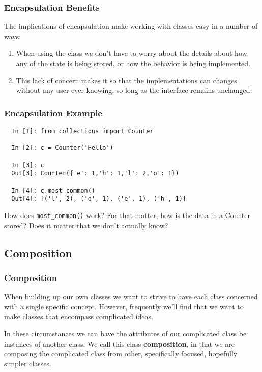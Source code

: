 \documentclass{beamer}
\begin{document}
\begin{frame}
  \frametitle{Encapsulation Benefits}
  The implications of encapsulation make working with classes easy in a number of ways: \vspace{4mm}

  \begin{enumerate}
    \item<1-> When using the class we don't have to worry about the details about how any of the state is being stored, or how the behavior is being implemented.
    \item<2-> This lack of concern makes it so that the implementations can changes without any user ever knowing, so long as the interface remains unchanged.
  \end{enumerate}
\end{frame}

\begin{frame}[fragile]
  \frametitle{Encapsulation Example}
  \begin{lstlisting}
  In [1]: from collections import Counter

  In [2]: c = Counter('Hello')
 
  In [3]: c
  Out[3]: Counter({'e': 1,'h': 1,'l': 2,'o': 1})

  In [4]: c.most_common()
  Out[4]: [('l', 2), ('o', 1), ('e', 1), ('h', 1)]
  \end{lstlisting}
  \vspace{5mm}
  \pause
  How does \texttt{most\_common()} work? For that matter, how is the data in a Counter stored? Does it matter that we don't actually know?
\end{frame}

\subsection{Composition}
\begin{frame}
  \frametitle{Composition}
  When building up our own classes we want to strive to have each class concerned with a single specific concept. However, frequently we'll find that we want to make classes that encompass complicated ideas. \vspace{4mm}

  In these circumstances we can have the attributes of our complicated class be instances of another class. We call this class \textbf{composition}, in that we are composing the complicated class from other, specifically focused, hopefully simpler classes.
\end{frame}
\end{document}
